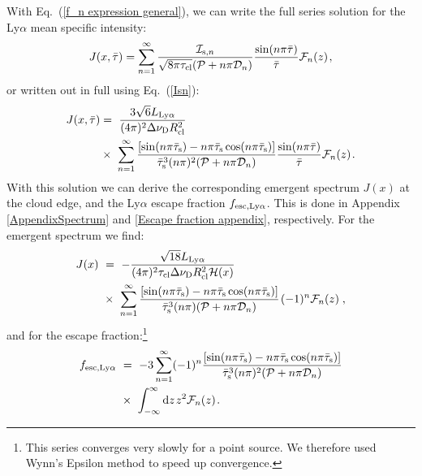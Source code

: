 \documentclass[fleqn,usenatbib]{mnras}
\newcommand{\taucl}{\tau_{\rm cl}}
\begin{document}
With Eq.~(\ref{f_n expression general}), we can write the full series solution for the Ly$\alpha$ mean specific intensity:
\begin{equation}
    J(x, \Bar{\tau}) = \sum_{n=1}^{\infty} \dfrac{\mathcal{I}_{\textrm{s}, n}}{\sqrt{8 \pi \taucl}(\mathcal{P} + n \pi\mathcal{D}_n)}  \dfrac{\sin(n \pi \Bar{\tau})}{\Bar{\tau}}  \mathcal{F}_n(z)  \hspace{1 pt} ,
\end{equation}
or written out in full using Eq.~(\ref{Isn}):
\begin{align}
    J(x, \Bar{\tau}) &=~ \dfrac{3 \sqrt{6} L_{\rm Ly\alpha}}{(4\pi)^2 \Delta\nu_{\rm D} R_{\rm cl}^2 } \nonumber \\ &\times~ \sum_{n = 1}^{\infty} \dfrac{[\sin(n \pi \Bar{\tau}_{\rm s}) - n\pi \Bar{\tau}_{\rm s}\cos(n \pi \Bar{\tau}_{\rm s})]}{\Bar{\tau}_{\rm s}^3 (n\pi)^2 (\mathcal{P} + n \pi \mathcal{D}_n)} \dfrac{\sin(n \pi \Bar{\tau})}{\Bar{\tau}} \mathcal{F}_n(z) \hspace{1 pt} \label{series solution}.
\end{align}
With this solution we can derive the corresponding emergent spectrum $J(x)$ at the cloud edge, and the Ly$\alpha$ escape fraction $f_{\rm esc, Ly\alpha}$. This is done in Appendix \ref{AppendixSpectrum} and \ref{Escape fraction appendix}, respectively. For the emergent spectrum we find: 
\begin{align}
    J(x) ~&=~ -\dfrac{\sqrt{18} L_{\rm Ly\alpha}}{(4\pi)^2  \taucl \Delta \nu_{\rm D} R_{\rm cl}^2 \mathcal{H}(x)} \nonumber \\ ~&\times ~\sum_{n=1}^{\infty} \dfrac{ [\sin(n\pi \Bar{\tau}_{\rm s}) - n\pi \Bar{\tau}_{\rm s} \cos( n\pi \Bar{\tau}_{\rm s})] }{\Bar{\tau}_{\rm s}^3 (n \pi) (\mathcal{P} + n\pi \mathcal{D}_n)} \hspace{1 pt}  (-1)^n \mathcal{F}_n(z) \hspace{1 pt} \, \label{spectrum main text},
\end{align}
and for the escape fraction:\footnote{This series converges very slowly for a point source. We therefore used Wynn's Epsilon method to speed up convergence.}
\begin{align}
    f_{\rm esc, Ly\alpha} ~&=~ -3 \sum_{n = 1}^{\infty} (-1)^n \dfrac{[\sin(n \pi \Bar{\tau}_{\rm s}) - n\pi \Bar{\tau}_{\rm s}\cos(n \pi \Bar{\tau}_{\rm s})]}{\Bar{\tau}_{\rm s}^3 (n\pi)^2 (\mathcal{P} + n \pi \mathcal{D}_n)} \nonumber\\ ~&\times~ \int_{-\infty}^{\infty} \textrm{d}z \hspace{1 pt} z^2  \mathcal{F}_{n}(z) \hspace{1 pt} \label{fesc main text}.
\end{align}
\end{document}
